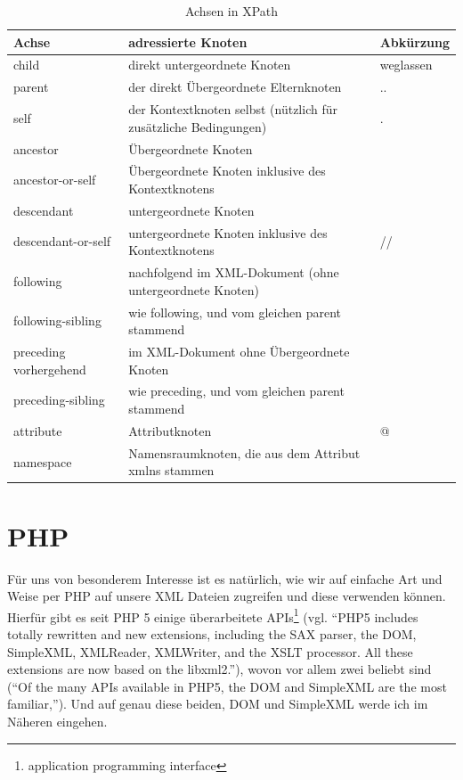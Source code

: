 {\small
  \begin{table}[hb]
    \caption{Achsen in XPath\cite{wiki:de:xpath}}
    \begin{tabularx}{\textwidth}{l|X|l}
      Achse & adressierte Knoten & Abkürzung \\
      \hline
      child & direkt untergeordnete Knoten & weglassen \\
      parent & der direkt Übergeordnete Elternknoten  & .. \\
      self & der Kontextknoten selbst (nützlich für zusätzliche Bedingungen) & . \\
      ancestor & Übergeordnete Knoten & \\
      ancestor-or-self & Übergeordnete Knoten inklusive des Kontextknotens & \\
      descendant & untergeordnete Knoten & \\
      descendant-or-self & untergeordnete Knoten inklusive des Kontextknotens & // \\
      following & nachfolgend im XML-Dokument (ohne untergeordnete Knoten) & \\
      following-sibling & wie following, und vom gleichen parent stammend & \\
      preceding vorhergehend & im XML-Dokument ohne Übergeordnete Knoten & \\
      preceding-sibling & wie preceding, und vom gleichen parent stammend & \\
      attribute & Attributknoten & @ \\
      namespace & Namensraumknoten, die aus dem Attribut xmlns stammen &
    \end{tabularx}
  \end{table}
}

\section{PHP}\label{xml-php}
Für uns von besonderem Interesse ist es natürlich, wie wir auf
einfache Art und Weise per PHP auf unsere XML Dateien zugreifen und
diese verwenden können. Hierfür gibt es seit PHP 5 einige
überarbeitete APIs\footnote{application programming interface} (vgl.
\enquote{PHP5 includes totally rewritten and new extensions, including
  the SAX parser, the DOM, SimpleXML, XMLReader, XMLWriter, and the
  XSLT processor. All these extensions are now based on the
  libxml2.}\cite{www:ibm:xml}), wovon vor allem zwei beliebt sind
(\enquote{Of the many APIs available in PHP5, the DOM and SimpleXML
  are the most familiar,}\cite{www:ibm:xml}). Und auf genau diese
beiden, DOM und SimpleXML werde ich im Näheren eingehen.
